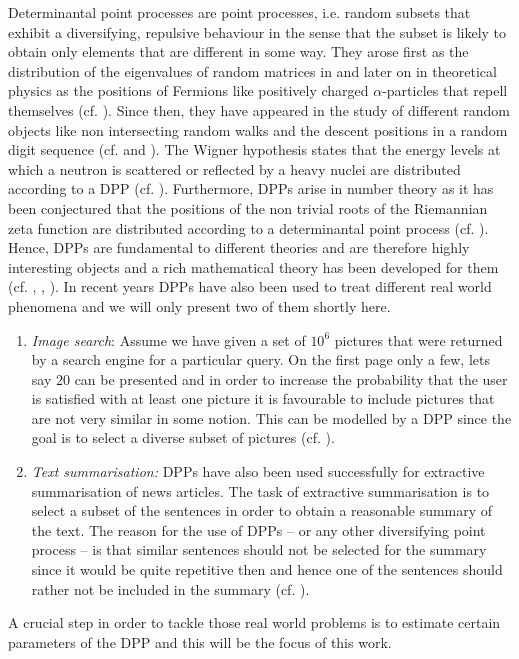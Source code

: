 Determinantal point processes are point processes, i.e. random subsets that exhibit a diversifying, repulsive behaviour in the sense that the subset is likely to obtain only elements that are different in some way. They arose first as the distribution of the eigenvalues of random matrices in \cite{mehta1960density} and later on in theoretical physics as the positions of Fermions like positively charged \(\alpha\)-particles that repell themselves (cf. \cite{benard1973detection}). Since then, they have appeared in the study of different random objects like non intersecting random walks and the descent positions in a random digit sequence (cf. \cite{johansson2004determinantal} and \cite{borodin2010adding}). The Wigner hypothesis states that the energy levels at which a neutron is scattered or reflected by a heavy nuclei are distributed according to a DPP (cf. \cite{tao2010universality}). Furthermore, DPPs arise in number theory as it has been conjectured that the positions of the non trivial roots of the Riemannian zeta function are distributed according to a determinantal point process (cf. \cite{bourgade2013quantum}). Hence, DPPs are fundamental to different theories and are therefore highly interesting objects and a rich mathematical theory has been developed for them (cf. \cite{borodin2009determinantal}, \cite{hough2006determinantal}, \cite{lyons2003determinantal}).
In recent years DPPs have also been used to treat different real world phenomena and we will only present two of them shortly here.
\begin{enumerate}
\item \emph{Image search}: Assume we have given a set of \(10^6\) pictures that were returned by a search engine for a particular query. On the first page only a few, lets say \(20\) can be presented and in order to increase the probability that the user is satisfied with at least one picture it is favourable to include pictures that are not very similar in some notion. This can be modelled by a DPP since the goal is to select a diverse subset of pictures (cf. \cite{kulesza2011k}). %
\item \emph{Text summarisation:} DPPs have also been used successfully for extractive summarisation of news articles. The task of extractive summarisation is to select a subset of the sentences in order to obtain a reasonable summary of the text. The reason for the use of DPPs -- or any other diversifying point process -- is that similar sentences should not be selected for the summary since it would be quite repetitive then and hence one of the sentences should rather not be included in the summary (cf. \cite{kulesza2012learning1}). 
\end{enumerate}
A crucial step in order to tackle those real world problems is to estimate certain parameters of the DPP and this will be the focus of this work. %

